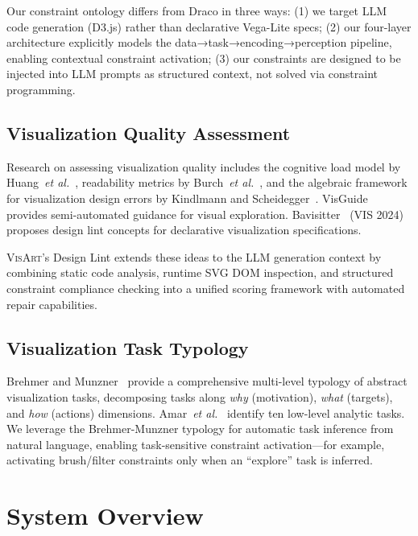 \documentclass[journal]{vgtc}
\newcommand{\sysname}{\textsc{VisArt}}
\newcommand{\etal}{\textit{et al.}}
\begin{document}
Our constraint ontology differs from Draco in three ways:
(1) we target LLM code generation (D3.js) rather than declarative Vega-Lite specs;
(2) our four-layer architecture explicitly models the data→task→encoding→perception pipeline, enabling contextual constraint activation;
(3) our constraints are designed to be injected into LLM prompts as structured context, not solved via constraint programming.

\subsection{Visualization Quality Assessment}

Research on assessing visualization quality includes the cognitive load model by Huang~\etal{}~\cite{huang2009measuring}, readability metrics by Burch~\etal{}~\cite{burch2011evaluation}, and the algebraic framework for visualization design errors by Kindlmann and Scheidegger~\cite{kindlmann2014algebraic}.
VisGuide~\cite{ceneda2019guide} provides semi-automated guidance for visual exploration.
Bavisitter~\cite{mcnutt2024bavisitter} (VIS 2024) proposes design lint concepts for declarative visualization specifications.

\sysname{}'s Design Lint extends these ideas to the LLM generation context by combining static code analysis, runtime SVG DOM inspection, and structured constraint compliance checking into a unified scoring framework with automated repair capabilities.

\subsection{Visualization Task Typology}

Brehmer and Munzner~\cite{brehmer2013multi} provide a comprehensive multi-level typology of abstract visualization tasks, decomposing tasks along \textit{why} (motivation), \textit{what} (targets), and \textit{how} (actions) dimensions.
Amar~\etal{}~\cite{amar2005low} identify ten low-level analytic tasks.
We leverage the Brehmer-Munzner typology for automatic task inference from natural language, enabling task-sensitive constraint activation—for example, activating brush/filter constraints only when an ``explore'' task is inferred.

\section{System Overview}
\end{document}
